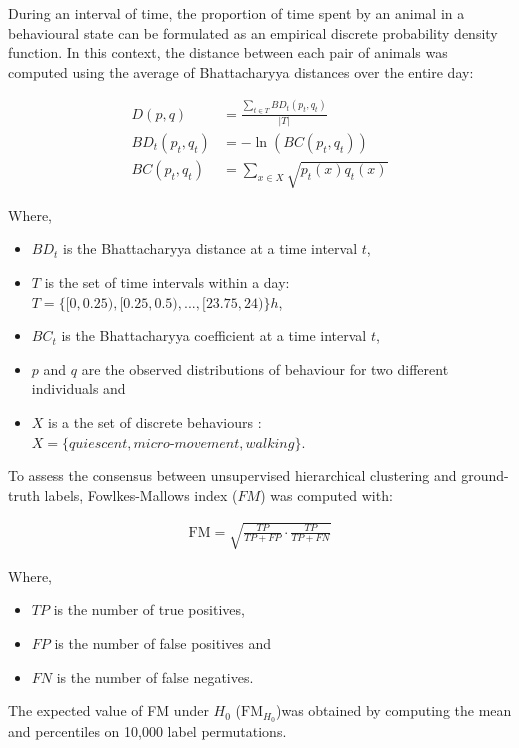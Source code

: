 During an interval of time, the proportion of time spent by an animal in a behavioural state can be formulated as an empirical discrete probability density function. In this context, the distance between each pair of animals was computed using the average of Bhattacharyya distances\cite{bhattacharyya_measure_1943} over the entire day:

\begin{align}
D(p,q) &=  \frac{\sum_{t \in T}{BD_t(p_t,q_t)}}{|T|} \\
BD_t(p_t,q_t) &= -\ln (BC(p_t,q_t))\\
BC(p_t,q_t) &= \sum_{x\in X} \sqrt{p_t(x) q_t(x)}
\end{align}


Where,
\begin{itemize}
	\item $BD_t$ is the Bhattacharyya distance at a time interval $t$,
	\item $T$ is the set of  time intervals within a day:\\
		$T=\{[0, 0.25), [0.25,0.5), ..., [23.75, 24)\} h$,
	\item $BC_t$ is the Bhattacharyya coefficient at a time interval $t$,
	\item $p$ and $q$ are the observed distributions of behaviour for two different individuals and
	\item $X$ is a the set of discrete behaviours : \\
		$X = \{quiescent, micro\text{-}movement, walking\}$.
\end{itemize}

To assess the consensus between unsupervised hierarchical clustering and ground-truth labels,
Fowlkes-Mallows index\cite{fowlkes_method_1983} ($FM$) was computed with:

\begin{align}
\text{FM} = \sqrt{ \frac {TP}{TP+FP} \cdot \frac{TP}{TP+FN}  }
\end{align}

Where,
\begin{itemize}
	\item $TP$ is the number of true positives,
	\item $FP$ is the number of false positives and
	\item $FN$  is the number of false negatives.

\end{itemize}

The expected value of FM under $H_0$ ($\text{FM}_{H_0}$)was obtained by computing the mean and percentiles on 10,000 label permutations.

